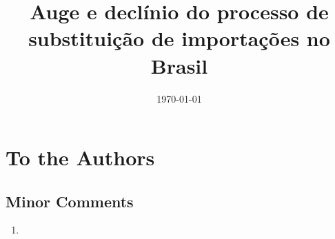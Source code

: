 \documentclass[12pt,twoside]{article}
\title{Auge e declínio do processo de substituição de importações no Brasil}
\author[1]{\referee}
\date{\today}
\begin{document}
\maketitle

\begin{lettereditor}
  \lipsum[1-5] %
\end{lettereditor}

\clearpage

\maketitle

\section{To the Authors}
\lipsum[6-7] %
\subsection{Minor Comments}
\begin{enumerate}[label = (\roman*)]
  \item \lipsum[8]
\end{enumerate}
\end{document}
